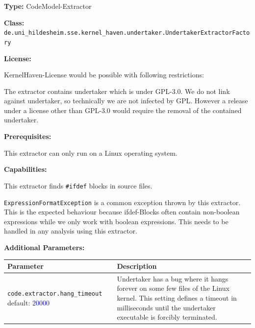 \textbf{Type:} CodeModel-Extractor

\textbf{Class:} \texttt{de.uni\_hildesheim.sse.kernel\_haven.undertaker.UndertakerExtractorFactory}

\textbf{License:}

KernelHaven-License would be possible with following restrictions:

The extractor contains undertaker which is under GPL-3.0. We do not link against undertaker, so technically we are not infected by GPL. However a release under a license other than GPL-3.0 would require the removal of the contained undertaker.

\textbf{Prerequisites:}

This extractor can only run on a Linux operating system.

\textbf{Capabilities:}

This extractor finds \texttt{\#ifdef} blocks in source files.

\texttt{ExpressionFormatException}  is a common exception thrown by this extractor. This is the expected behaviour because ifdef-Blocks often contain non-boolean expressions while we only work with boolean expressions. This needs to be handled in any analysis using this extractor.

\textbf{Additional Parameters:}

\begin{table}[h!] %
    \begin{tabularx}{\textwidth}{|p{}|p{}|}\hline
        \textbf{Parameter} & \textbf{Description} \\ \hline \hline
        
        \texttt{code.extractor.hang\_timeout} \newline default: \textcolor{blue}{20000} & Undertaker has a bug where it hangs forever on some few files of the Linux kernel. This setting defines a timeout in milliseconds until the undertaker executable is forcibly terminated. \\ \hline
        
    \end{tabularx}
\end{table}




